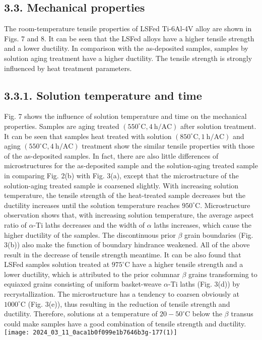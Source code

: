 \documentclass[10pt]{article}
\begin{document}
\subsection*{3.3. Mechanical properties}
The room-temperature tensile properties of LSFed Ti-6Al-4V alloy are shown in Figs. 7 and 8. It can be seen that the LSFed alloys have a higher tensile strength and a lower ductility. In comparison with the as-deposited samples, samples by solution aging treatment have a higher ductility. The tensile strength is strongly influenced by heat treatment parameters.

\subsection*{3.3.1. Solution temperature and time}
Fig. 7 shows the influence of solution temperature and time on the mechanical properties. Samples are aging treated $\left(550^{\circ} \mathrm{C}, 4 \mathrm{~h} / \mathrm{AC}\right)$ after solution treatment. It can be seen that samples heat treated with solution $\left(850^{\circ} \mathrm{C}, 1 \mathrm{~h} / \mathrm{AC}\right)$ and aging $\left(550^{\circ} \mathrm{C}, 4 \mathrm{~h} / \mathrm{AC}\right)$ treatment show the similar tensile properties with those of the as-deposited samples. In fact, there are also little differences of microstructures for the as-deposited sample and the solution-aging treated sample in comparing Fig. 2(b) with Fig. 3(a), except that the microstructure of the solution-aging treated sample is coarsened slightly. With increasing solution temperature, the tensile strength of the heat-treated sample decreases but the ductility increases until the solution temperature reaches $950^{\circ} \mathrm{C}$. Microstructure observation shows that, with increasing solution temperature, the average aspect ratio of $\alpha$-Ti laths decreases and the width of $\alpha$ laths increases, which cause the higher ductility of the samples. The discontinuous prior $\beta$ grain boundaries (Fig. 3(b)) also make the function of boundary hindrance weakened. All of the above result in the decrease of tensile strength meantime. It can be also found that LSFed samples solution treated at $975^{\circ} \mathrm{C}$ have a higher tensile strength and a lower ductility, which is attributed to the prior columnar $\beta$ grains transforming to equiaxed grains consisting of uniform basket-weave $\alpha$-Ti laths (Fig. 3(d)) by recrystallization. The microstructure has a tendency to coarsen obviously at $1000^{\circ} \mathrm{C}$ (Fig. 3(e)), thus resulting in the reduction of tensile strength and ductility. Therefore, solutions at a temperature of $20-50^{\circ} \mathrm{C}$ below the $\beta$ transus could make samples have a good combination of tensile strength and ductility.\\
\texttt{[image: 2024\_03\_11\_0aca1b0f099e1b7646b3g-177(1)]}
\end{document}
